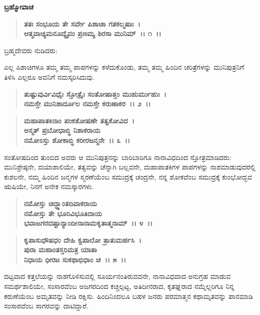 \emptypage

\begin{flushleft}
\textbf{ಬ್ರಹ್ಮೋವಾಚ}
\end{flushleft}

\begin{verse}
\textbf{ತತಃ ಸಂಭೂಯ ತೇ ಸರ್ವೇ ಪಿಶಾಚಾ ಗತಕಲ್ಮಷಾಃ~।}\\\textbf{ಆತ್ಮವಾಚ್ಯಮನೂದ್ಯೈವಂ ಪ್ರಣಮ್ಯ ಶಿರಸಾ ಮುನಿಮ್~।। ೧~।।}
\end{verse}

\begin{flushleft}
ಬ್ರಹ್ಮದೇವರು ನುಡಿದರು:
\end{flushleft}

ಎಲ್ಲ ಪಿಶಾಚಿಗಳೂ ತಮ್ಮ ತಮ್ಮ ಪಾಪಗಳನ್ನು ಕಳೆದುಕೊಂಡು, ತಮ್ಮ ತಮ್ಮ ಹಿಂದಿನ ಚರಿತ್ರೆಗಳನ್ನು ಮುನಿಪುತ್ರನಿಗೆ ತಿಳಿಸಿ ಎಲ್ಲರೂ ಅವನಿಗೆ ನಮಸ್ಕರಿಸಿದುವು.

\begin{verse}
\textbf{ತುಷ್ಟುವುರ್ವಿವಿಧೈಃ ಸ್ತೋತ್ರೈಃ ಸಂತೋಷಾತ್ತಂ ಮುಹುರ್ಮುಹುಃ~।}\\\textbf{ನಮಸ್ತೇ ಮುನಿಶಾರ್ದೂಲ ನಮಸ್ತೇ ಕರುಣಾಕರ~।। ೨~।। }
\end{verse}

\begin{verse}
\textbf{ಮಹಾಪಾತಕಿನಾಂ ಪಂಕಶೋಷಣೇ ತತ್ವಕೋವಿದ~।}\\\textbf{ಅಸ್ಮತ್ ಪ್ರಬೋಧಾಬ್ಧಿ ನಿಶಾಕರಾಯ} \\\textbf{ನಮೋಽಸ್ತು ಶೋಕಾಬ್ಧಿ ಕರೀರಜನ್ಮನೇ~।। ೩~।।}
\end{verse}

ಸಂತೋಷದಿಂದ ತುಂಬಿದ ಅವರು ಆ ಮುನಿಪುತ್ರನನ್ನು ಬಾರಿಬಾರಿಗೂ ನಾನಾವಿಧದಿಂದ ಸ್ತೋತ್ರಮಾಡಿದರು: ಮುನಿಶ್ರೇಷ್ಠನೇ, ದಯಾಶಾಲಿಯೇ, ತತ್ವವನ್ನು ಚೆನ್ನಾಗಿ ಬಲ್ಲವನೇ, ಮಹಾಪಾತಕಿಗಳ ಪಾಪಗಳನ್ನು ನಾಶಮಾಡುವುದರಲ್ಲಿ ಕುಶಲನೇ, ನಮ್ಮ ಹಿಂದಿನ ಜನ್ಮಗಳ ಸ್ಮರಣೆಯೆಂಬ ಸಮುದ್ರಕ್ಕೆ ಚಂದ್ರನೇ, ನನ್ನ ಶೋಕವೆಂಬ ಸಮುದ್ರಕ್ಕೆ ಕುಂಭೋದ್ಭವ ಋಷಿಯೇ, ನಿನಗೆ ಅನೇಕ ನಮಸ್ಕಾರಗಳು.

\begin{verse}
\textbf{ನಮೋಸ್ತು ಚಿದ್ಧ್ವಾಂತದಿವಾಕರಾಯ} \\\textbf{ನಮೋಸ್ತು ತೇ ಭೂರಿವಿಭೂತಿದಾಯ}\\\textbf{ಭವಾಜಗರದಷ್ಟಾನ್ಯಾಂದೀನಾನಾಮಕೃತಾತ್ಮನಾಮ್~।। ೪~।।} 
\end{verse}

\begin{verse}
\textbf{ಕೃಪಾಸುಧೌಷಧಂ ದೇಹಿ ಕ್ವಪಾಲೋ ತ್ರಾತುಮರ್ಹಸಿ~।}\\\textbf{ಪುರಾ ಮಹಾಂತಸ್ತರಿಮತ್ರ ಯಾತಾ}\\\textbf{ನಿಧಾಯ ಧೀರಾಃ ಸುಕಥಾಭಿಧಾಂ ಚ~।। ೫~।।}
\end{verse}

ದಟ್ಟವಾದ ಕತ್ತಲೆಯನ್ನು ನಾಶಗೊಳಿಸುವಲ್ಲಿ ಸೂರ್ಯನಂತಿರುವವನೇ, ನಾನಾವಿಧವಾದ ಅನುಗ್ರಹ ಮಾಡುವ ಸಮರ್ಥಶಾಲಿಯೇ, ಸಂಸಾರವೆಂಬ ಅಜಗರದಿಂದ ಕಚ್ಚಲ್ಪಟ್ಟ, ಅತಿ\-ದೀನರಾದ, ಕೃತಘ್ನರಾದ ನಮ್ಮೆಲ್ಲರಿಗೂ ನಿನ್ನ ಕರುಣೆಯೆಂಬ ಅಮೃತವನ್ನು ನೀಡಿ ರಕ್ಷಿಸು. ಹಿಂದಿನಿಂದಲೂ ಬಹಳ ಜನರು ಪರಮಾತ್ಮನ ಕಥಾಮೃತವನ್ನು ಪಾನಮಾಡಿ ಸಂಸಾರವೆಂಬ ಸಾಗರವನ್ನು ದಾಟಿದ್ದಾರೆ.

